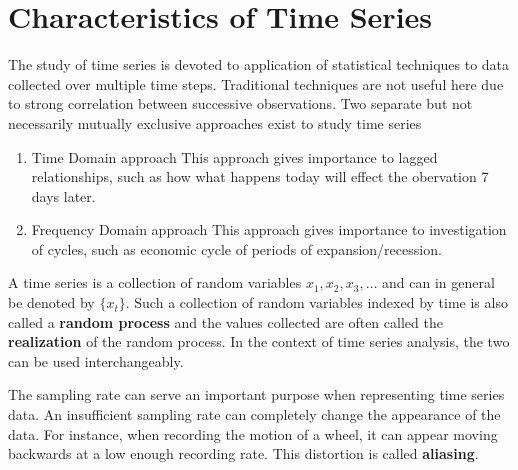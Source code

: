 \documentclass[../../time_series_notes.tex]{subfiles}
\begin{document}
\chapter{Characteristics of Time Series}
The study of time series is devoted to application of statistical techniques to data collected over multiple time steps. Traditional techniques are not useful here due to strong correlation between successive observations.\newline
Two separate but not necessarily mutually exclusive approaches exist to study time series
\begin{enumerate}
    \item Time Domain approach
    This approach gives importance to lagged relationships, such as how what happens today will effect the obervation 7 days later.
    \item Frequency Domain approach
    This approach gives importance to investigation of cycles, such as economic cycle of periods of expansion/recession.
\end{enumerate}

A time series is a collection of random variables $x_{1}, x_{2}, x_{3}, \ldots$ and can in general be denoted by $\{x_{t}\}$. Such a collection of random variables indexed by time is also called a \textbf{random process} and the values collected are often called the \textbf{realization} of the random process. In the context of time series analysis, the two can be used interchangeably.\newline

The sampling rate can serve an important purpose when representing time series data. An insufficient sampling rate can completely change the appearance of the data. For instance, when recording the motion of a wheel, it can appear moving backwards at a low enough recording rate. This distortion is called \textbf{aliasing}.
\end{document}
